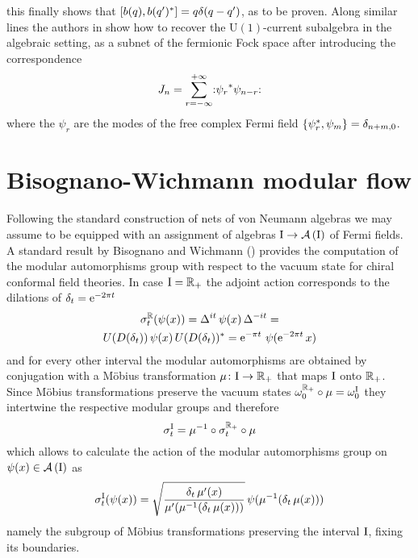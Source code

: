  this finally shows
 that $[b(q),b(q')^*]=q\delta(q-q')$, as to be proven.
 Along similar lines the authors in \cite{BischTan:2013}
 show how to recover the $\textrm{U}(1)$-current subalgebra
 in the algebraic setting, as a subnet of the fermionic Fock
 space after introducing the correspondence
 \[
 J_n=\sum_{r=-\infty}^{+\infty}\wick{{\psi_r}^*\psi_{n-r}}
 \]
 where the $\psi_r$ are the modes of the free complex Fermi field
 $\{\psi^*_r,\psi_m\}=\delta_{n+m,0}$.

 
 
 \section{Bisognano-Wichmann modular flow}
 \label{BW_modular_flow_intervals}
 Following the standard construction of nets of von 
 Neumann algebras we may assume to be equipped with 
 an assignment of algebras $\textrm{I}\to\mathcal{A}\left(\textrm{I}\right)$ of Fermi fields. 
 A standard result by Bisognano and Wichmann
 (\cite{BiWi:1975}) provides the computation of the 
 modular automorphisms group with respect to the vacuum 
 state for chiral conformal field theories. 
 In case $\textrm{I}=\mathbb{R}_+$ the adjoint action corresponds 
 to the dilations of $\delta_t=\operatorname{e}^{-2\pi t}$
 \begin{multline}
 \label{BWdil}
 \sigma^{\mathbb{R}}_t(\psi(x))=\Delta^{it}\,\psi(x)\,\Delta^{-it}=\\
 U(D(\delta_t))\,\psi(x)\,U(D(\delta_t))^*=
 \operatorname{e}^{-\pi t}\,\psi(\operatorname{e}^{-2\pi t}x)
 \end{multline}
 and for every other interval the modular automorphisms are
 obtained by conjugation with a M\"{o}bius transformation
 $\mu\colon \textrm{I}\to\mathbb{R}_+$ that maps $\textrm{I}$ onto $\mathbb{R}_+$. Since
 M\"{o}bius transformations preserve the vacuum states
 $\omega_0^{\mathbb{R}_+}\circ\mu=\omega_0^{\textrm{I}}$
 they intertwine the respective modular groups and therefore
 \[
 \sigma_t^{\textrm{I}} = \mu^{-1}\circ\sigma_t^{\mathbb{R}_+}\circ\mu
 \]
 which allows to calculate the action of the modular automorphisms group
 on $\psi(x)\in\mathcal{A}\left(\textrm{I}\right)$ as
 \[
 \sigma^{\textrm{I}}_t(\psi(x))=\sqrt{\frac{\delta_t\,\mu'(x)}
 {\mu'(\mu^{-1}(\delta_t\,\mu(x)))}}\, 
 \psi(\mu^{-1}(\delta_t\,\mu(x)))
 \]
 namely the subgroup of M\"{o}bius transformations preserving
 the interval $\textrm{I}$, fixing its boundaries. 

